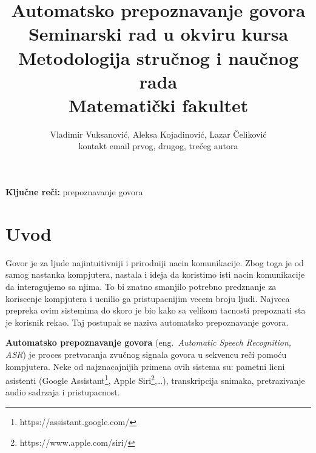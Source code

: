 \documentclass[a4paper]{article}
\begin{document}
\title{Automatsko prepoznavanje govora\\ \small{Seminarski rad u okviru kursa\\Metodologija stručnog i naučnog rada\\Matematički fakultet}}

\author{Vladimir Vuksanović, Aleksa Kojadinović, Lazar Čeliković\\kontakt email prvog, drugog, trećeg autora}


\maketitle


\bigskip
\textbf{Ključne reči:} prepoznavanje govora

\tableofcontents

\newpage

\section{Uvod}
\label{sec:uvod}

Govor je za ljude najintuitivniji i prirodniji nacin komunikacije. Zbog toga je od samog nastanka kompjutera, nastala i ideja da koristimo isti nacin komunikacije da interagujemo sa njima.
To bi znatno smanjilo potrebno predznanje za koriscenje kompjutera i ucnilio ga pristupacnijim vecem broju ljudi. Najveca prepreka ovim sistemima do skoro je bio kako sa velikom tacnosti prepoznati sta je korisnik rekao.
Taj postupak se naziva automatsko prepoznavanje govora.

\textbf{Automatsko prepoznavanje govora} (eng.~{\em Automatic Speech Recognition, ASR}) je proces pretvaranja zvučnog signala govora u sekvencu reči pomoću kompjutera.
Neke od najznacajnijih primena ovih sistema su: pametni licni asistenti (Google Assistant\footnote{https://assistant.google.com/}, Apple Siri\footnote{https://www.apple.com/siri/},\dots), transkripcija snimaka, pretrazivanje audio sadrzaja i pristupacnost.
\end{document}
